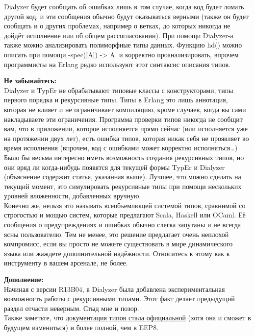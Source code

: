 \documentclass[a4paper,12pt]{report}
\newcommand{\ops}{\colorbox{lgreen}}
\begin{document}
Dialyzer будет сообщать об ошибках лишь в том случае, когда код будет ломать другой код, и эти сообщения обычно будут оказываться верными (также он будет сообщать и о других проблемах, например о ветках, до которых никогда не дойдёт исполнение или об общем рассогласовании). При помощи Dialyzer\--а также можно анализировать полиморфные типы данных. Функцию \ops{hd()} можно описать при помощи \ops{-spec([A]) -> A.} и корректно проанализировать, впрочем программисты на Erlang редко используют этот синтаксис описания типов.\\
\colorbox{lorange}
{
    \begin{minipage}{\linewidth}
        \textbf{Не забывайтесь:}\\
Dialyzer и TypEr не обрабатывают типовые классы с конструкторами, типы первого порядка и рекурсивные типы. Типы в Erlang это лишь аннотация, которая не влияет и не ограничивает компиляцию, кроме случаев, когда вы сами накладываете эти ограничения. Программа проверки типов никогда не сообщит вам, что в приложении, которое исполняется прямо сейчас (или исполняется уже на протяжении двух лет), есть ошибка типов, которая никак себя не проявляет во время исполнения (впрочем, код с ошибками может корректно исполняться\ldots)\\
Было бы весьма интересно иметь возможность создания рекурсивных типов, но они вряд ли когда\--нибудь появятся для текущей формы TypEr и Dialyzer (объяснение содержит статья, указанная выше). Лучшее, что можно сделать на текущий момент, это симулировать рекурсивные типы при помощи нескольких уровней вложенности, добавленных вручную.\\
Конечно же, нельзя это называть всеобъемлющей системой типов, сравнимой со строгостью и мощью систем, которые предлагают Scala, Haskell или OCaml. Её сообщения о предупреждениях и ошибках обычно слегка запутаны и не всегда ясны пользователю. Тем не менее, это решение предлагает очень неплохой компромисс, если вы просто не можете существовать в мире динамического языка или жаждете дополнительной надёжности. Относитесь к этому как к инструменту в вашем арсенале, не более.
    \end{minipage}
}
\colorbox{lgray}
{
    \begin{minipage}{\linewidth}
\textbf{Дополнение:}\\
Начиная с версии R13B04, в Dialyzer была добавлена экспериментальная возможность работы с рекурсивными типами. Этот факт делает предыдущий раздел отчасти неверным. Стыд мне и позор.\\
Также заметьте, что \href{http://erlang.org/doc/reference\_manual/typespec.html}{документация типов стала официальной} (хотя она и сможет в будущем измениться) и более полной, чем в EEP8.
    \end{minipage}
}
\end{document}
